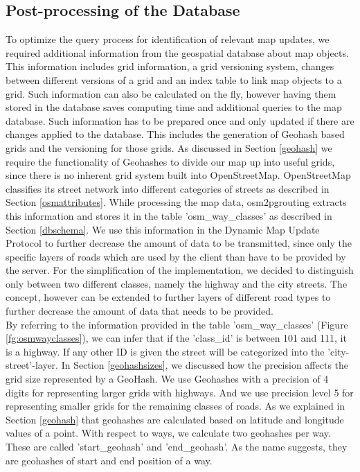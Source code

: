 \subsection{Post-processing of the Database} \label{postprocessing}
To optimize the query process for identification of relevant map updates, we required additional information from the geospatial database about map objects. This information includes grid information, a grid versioning system, changes between different versions of a grid and an index table to link map objects to a grid. Such information can also be calculated on the fly, however having them stored in the database saves computing time and additional queries to the map database. Such information has to be prepared once and only updated if there are changes applied to the database. This includes the generation of Geohash based grids and the versioning for those grids. As discussed in Section \ref{geohash} we require the functionality of Geohashes to divide our map up into useful grids, since there is no inherent grid system built into OpenStreetMap. OpenStreetMap classifies its street network into different categories of streets as described in Section \ref{osmattributes}. While processing the map data, osm2pgrouting extracts this information and stores it in the table 'osm{\_}way{\_}classes' as described in Section \ref{dbschema}. We use this information in the Dynamic Map Update Protocol to further decrease the amount of data to be transmitted, since only the specific layers of roads which are used by the client than have to be provided by the server. For the simplification of the implementation, we decided to distinguish only between two different classes, namely the highway and the city streets. The concept, however can be extended to further layers of different road types to further decrease the amount of data that needs to be provided. 
\\

By referring to the information provided in the table 'osm{\_}way{\_}classes' (Figure \ref{fg:osmwayclasses}), we can infer that if the 'class{\_}id' is between 101 and 111, it is a highway. If any other ID is given the street will be categorized into the 'city-street'-layer. In Section \ref{geohashsizes}, we discussed how the precision affects the grid size represented by a GeoHash. We use Geohashes with a precision of 4 digits for representing larger grids with highways. And we use precision level 5 for representing smaller grids for the remaining classes of roads. As we explained in Section \ref{geohash} that geohashes are calculated based on latitude and longitude values of a point. With respect to ways, we calculate two geohashes per way. These are called 'start{\_}geohash' and 'end{\_}geohash'. As the name suggests, they are geohashes of start and end position of a way.
\\

